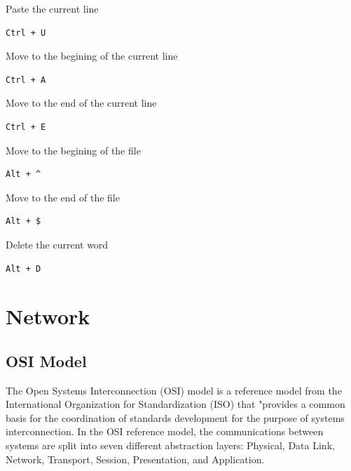 \documentclass{article}
\newenvironment{codetemplate}[1][]{%
  \mybasecolorbox[#1]
  \itshape
}{%
  \endmybasecolorbox
}
\begin{document}
Paste the current line
\begin{codetemplate}{}
\begin{verbatim}
Ctrl + U
\end{verbatim}
\end{codetemplate}

Move to the begining of the current line
\begin{codetemplate}{}
\begin{verbatim}
Ctrl + A
\end{verbatim}
\end{codetemplate}

Move to the end of the current line
\begin{codetemplate}{}
\begin{verbatim}
Ctrl + E
\end{verbatim}
\end{codetemplate}

Move to the begining of the file
\begin{codetemplate}{}
\begin{verbatim}
Alt + ^
\end{verbatim}
\end{codetemplate}

Move to the end of the file
\begin{codetemplate}{}
\begin{verbatim}
Alt + $
\end{verbatim}
\end{codetemplate}

Delete the current word
\begin{codetemplate}{}
\begin{verbatim}
Alt + D
\end{verbatim}
\end{codetemplate}


\newpage
\section{Network}

\subsection{OSI Model}

The Open Systems Interconnection (OSI) model is a reference model from the International Organization for Standardization (ISO) that "provides a common basis for the coordination of standards development for the purpose of systems interconnection. In the OSI reference model, the communications between systems are split into seven different abstraction layers: Physical, Data Link, Network, Transport, Session, Presentation, and Application.
\end{document}
